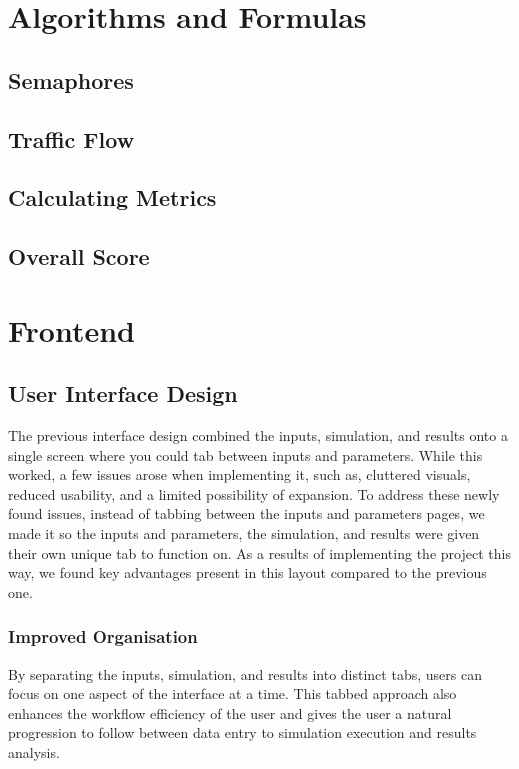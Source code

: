 \documentclass{article}
\begin{document}
    \section{Algorithms and Formulas}

    \subsection{Semaphores}

    \subsection{Traffic Flow}

    \subsection{Calculating Metrics}

    \subsection{Overall Score}

    \section{Frontend}

    \subsection{User Interface Design}
    The previous interface design combined the inputs, simulation, and results onto a single screen where you could tab between inputs and parameters. While this worked,
    a few issues arose when implementing it, such as, cluttered visuals, reduced usability, and a limited possibility of expansion. To address these newly found issues,
    instead of tabbing between the inputs and parameters pages, we made it so the inputs and parameters, the simulation, and results were given their own unique tab to
    function on. As a results of implementing the project this way, we found key advantages present in this layout compared to the previous one.

    \subsubsection{Improved Organisation}
    By separating the inputs, simulation, and results into distinct tabs, users can focus on one aspect of the interface at a time. This tabbed approach also enhances
    the workflow efficiency of the user and gives the user a natural progression to follow between data entry to simulation execution and results analysis.
\end{document}
